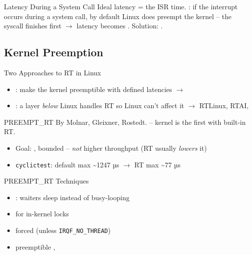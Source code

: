 \begin{corollary}{Latency During a System Call}
    Ideal latency = the ISR time. : if the interrupt occurs during a
    system call, by default Linux does  preempt the kernel -- the
    syscall finishes first $\to$ latency becomes .
    Solution: .
\end{corollary}

\subsection{Kernel Preemption}

\begin{concept}{Two Approaches to RT in Linux}
    \begin{itemize}
        \item {}: make the kernel
              preemptible with defined latencies $\to$ 
        \item {}: a layer \emph{below} Linux handles
              RT so Linux can't affect it $\to$ RTLinux, RTAI, 
    \end{itemize}
\end{concept}


\begin{definition}{PREEMPT\_RT}
    By Molnar, Gleixner, Rostedt.  --
    kernel  is the first with built-in RT.
    \begin{itemize}
        \item Goal: , bounded  -- \emph{not} higher throughput (RT usually \emph{lowers} it)
        \item \texttt{cyclictest}: default max \textasciitilde1247 µs $\to$ RT max \textasciitilde77 µs
    \end{itemize}
\end{definition}

\begin{corollary}{PREEMPT\_RT Techniques}
    \begin{itemize}
        \item {}: waiters sleep instead of busy-looping
        \item {} for in-kernel locks
        \item {} forced (unless \texttt{IRQF\_NO\_THREAD})
        \item preemptible , 
    \end{itemize}
\end{corollary}

